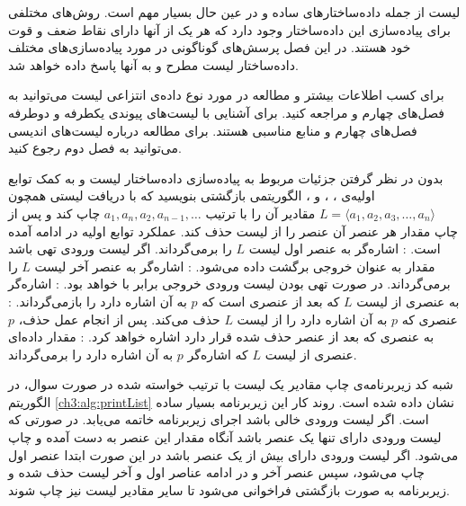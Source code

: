 
لیست‌ از جمله داده‌ساختارهای ساده و در عین حال بسیار مهم است. روش‌های مختلفی برای پیاده‌سازی این داده‌ساختار وجود دارد که هر یک از آنها دارای نقاط ضعف و قوت خود هستند. در این فصل پرسش‌های گوناگونی در مورد پیاده‌سازی‌های مختلف داده‌ساختار لیست مطرح و به آنها پاسخ داده خواهد شد.

برای کسب اطلاعات بیشتر و مطالعه در مورد نوع داده‌ی انتزاعی لیست می‌توانید به فصل‌های چهارم {\cite{ebrahimi}} و {\cite{horowitz}} مراجعه کنید. برای آشنایی با لیست‌های پیوندی یکطرفه و دوطرفه فصل‌های چهارم {\cite{ebrahimi}} و {\cite{shaffer}} منابع مناسبی هستند. برای مطالعه درباره لیست‌های اندیسی می‌توانید به فصل دوم {\cite{aho}} رجوع کنید.


 بدون در نظر گرفتن جزئیات مربوط به پیاده‌سازی داده‌ساختار لیست و به کمک توابع اولیه‌ی {}،  {}، {} و {}، الگوریتمی بازگشتی بنویسید که با دریافت لیستی همچون {$L=\langle a_1,a_2,a_3,\ldots,a_n\rangle$} مقادیر آن را با ترتیب {$a_1,a_n,a_2,a_{n-1},\ldots$} چاپ کند و پس از چاپ مقدار هر عنصر آن عنصر را از لیست حذف کند. عملکرد توابع اولیه در ادامه آمده است.
: اشاره‌گر به عنصر اول لیست {$L$} را برمی‌گرداند. اگر لیست ورودی تهی باشد مقدار {} به عنوان خروجی برگشت داده می‌شود.
: اشاره‌گر به عنصر آخر لیست {$L$} را برمی‌گرداند. در صورت تهی بودن لیست ورودی خروجی برابر با {} خواهد بود.
: اشاره‌گر به عنصری از لیست {$L$} که بعد از عنصری است که {$p$} به آن اشاره دارد را بازمی‌گرداند.
: عنصری که {$p$} به آن اشاره دارد را از لیست {$L$} حذف می‌کند. پس از انجام عمل حذف، {$p$} به عنصری که بعد از عنصر حذف شده قرار دارد اشاره خواهد کرد.
: مقدار داده‌ای عنصری از لیست {$L$} که اشاره‌گر {$p$} به آن اشاره دارد را برمی‌گرداند.


شبه کد زیربرنامه‌ی چاپ مقادیر یک لیست با ترتیب خواسته شده در صورت سوال، در الگوریتم {\eqref{ch3:alg:printList}} نشان داده شده است. روند کار این زیربرنامه بسیار ساده است. اگر لیست ورودی خالی باشد اجرای زیربرنامه خاتمه می‌یابد. در صورتی که لیست ورودی دارای تنها یک عنصر باشد آنگاه مقدار این عنصر به دست آمده و چاپ می‌شود. اگر لیست ورودی دارای بیش از یک عنصر باشد در این صورت ابتدا عنصر اول چاپ می‌شود، سپس عنصر آخر و در ادامه عناصر اول و آخر لیست حذف شده و زیربرنامه به صورت بازگشتی فراخوانی می‌شود تا سایر مقادیر لیست نیز چاپ شوند.

